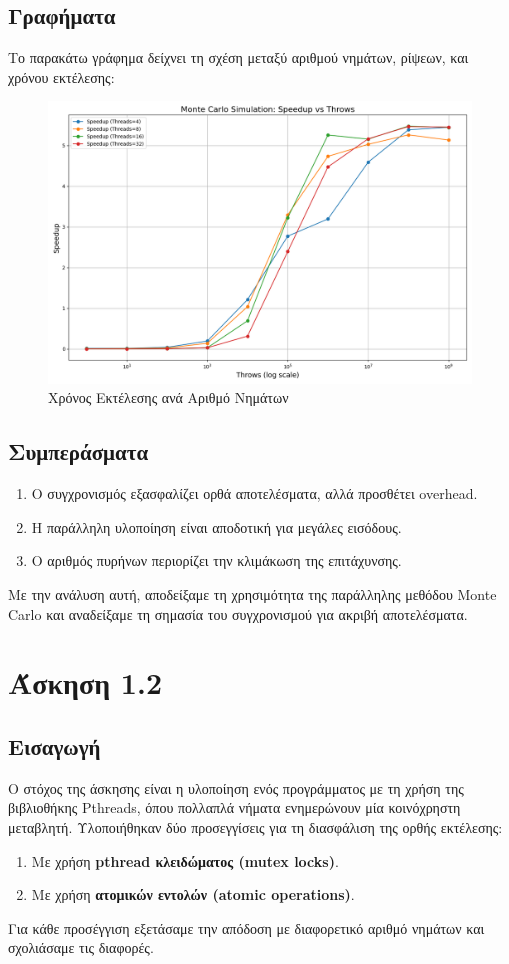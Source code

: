 \documentclass{article}
\begin{document}
\subsection*{Γραφήματα}
Το παρακάτω γράφημα δείχνει τη σχέση μεταξύ αριθμού νημάτων, ρίψεων, και χρόνου εκτέλεσης:
\begin{figure}[h]
    \centering
    \includegraphics[width=1\textwidth]{monte_carlo_results.png}
    \caption{Χρόνος Εκτέλεσης ανά Αριθμό Νημάτων}
\end{figure}
\subsection*{Συμπεράσματα}
\begin{enumerate}
    \item Ο συγχρονισμός εξασφαλίζει ορθά αποτελέσματα, αλλά προσθέτει overhead.
    \item Η παράλληλη υλοποίηση είναι αποδοτική για μεγάλες εισόδους.
    \item Ο αριθμός πυρήνων περιορίζει την κλιμάκωση της επιτάχυνσης.
\end{enumerate}
Με την ανάλυση αυτή, αποδείξαμε τη χρησιμότητα της παράλληλης μεθόδου Monte Carlo και αναδείξαμε τη σημασία του συγχρονισμού για ακριβή αποτελέσματα.
\section*{Άσκηση 1.2}
\subsection*{Εισαγωγή}
Ο στόχος της άσκησης είναι η υλοποίηση ενός προγράμματος με τη χρήση της βιβλιοθήκης Pthreads, όπου πολλαπλά νήματα ενημερώνουν μία κοινόχρηστη μεταβλητή. Υλοποιήθηκαν δύο προσεγγίσεις για τη διασφάλιση της ορθής εκτέλεσης:
\begin{enumerate}
    \item Με χρήση \textbf{pthread κλειδώματος (mutex locks)}.
    \item Με χρήση \textbf{ατομικών εντολών (atomic operations)}.
\end{enumerate}
Για κάθε προσέγγιση εξετάσαμε την απόδοση με διαφορετικό αριθμό νημάτων και σχολιάσαμε τις διαφορές.
\end{document}
